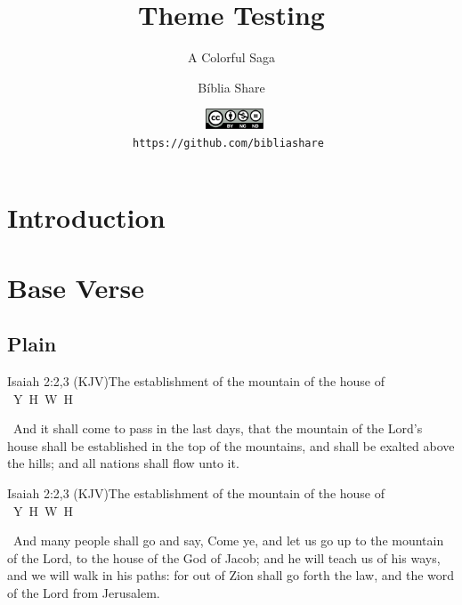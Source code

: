 \documentclass[12pt,aspectratio=169]{beamer}
\title{Theme Testing}
\subtitle{A Colorful Saga}
\author{Bíblia Share}
\date[\today]{{\scriptsize\tt%
    \includegraphics[height=6.0mm]{res/cc/by-nc-nd-88x31.pdf}\\[\smallskipamount]
    https://github.com/bibliashare
}}
\newcommand{\YA}{%
    \mbox{%
        Y\makebox[0pt][l]{\hspace{-0.178em}\raisebox{-0.00ex}{\scalebox{0.30}{E}}}%
        H\makebox[0pt][l]{\hspace{-0.010em}\raisebox{-0.00ex}{\scalebox{0.30}{O}}}%
        W\makebox[0pt][l]{\hspace{-0.245em}\raisebox{-0.00ex}{\scalebox{0.30}{A}}}%
        H%
    }%
}
\newcommand{\ver}[1]{%
    \raisebox{0.50ex}{%
        \scalebox{1.1}{%
            \pmb{\textbf{\textcolor{BSpbg}{#1}}}%
        }%
    }%
}
\newcommand{\QUOTE}[1]{%
    \par\noindent\hspace*{0.1\linewidth}%
    \begin{minipage}{0.8\linewidth}%
        \linespread{1.50}\large{#1}%
    \end{minipage}%
}
\begin{document}
    \begin{frame}
        \titlepage
    \end{frame}
    \section{Introduction}
    \section{Base Verse}
    \subsection{Plain}

    \begin{frame}{Isaiah 2:2,3 (KJV)}{The establishment of the mountain of the house of \YA}
        \QUOTE{%
            \ver{2}~And it shall come to pass in the last days, that the mountain of the
            Lord's house shall be established in the top of the mountains, and shall  be
            exalted above the hills; and all nations shall flow unto it.
        }
    \end{frame}

    \begin{frame}{Isaiah 2:2,3 (KJV)}{The establishment of the mountain of the house of \YA}
        \QUOTE{%
            \ver{3}~And many people shall go and say, Come ye, and let us go up  to  the
            mountain of the Lord, to the house of the God of Jacob; and he will teach us
            of his ways, and we will walk in his paths: for out of Zion shall  go  forth
            the law, and the word of the Lord from Jerusalem.
        }
    \end{frame}
\end{document}
